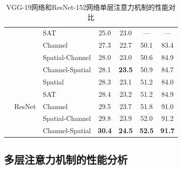 \begin{table}[htbp]
{\begin{tabular}{|l| l |l| c c c c|}
&  & SAT & 25.0 & 23.0 & --- & --- \\
&  & Channel & 27.3 & 22.7 & 50.1 & 83.4 \\
& & Spatial-Channel &28.0 &23.0 & 50.6& 84.9\\
& & Channel-Spatial & 28.1 & \textbf{23.5} & 50.9& 84.7\\
\cline{2-7}
& \multirow{5}{*}{ResNet} & Spatial & 28.3 & 23.1 & 51.2 & 84.0 \\
&  & SAT & 28.4 & 23.2 & 51.2 & 84.9 \\
&  & Channel & 29.5 & 23.7 & 51.8 & 91.0 \\
& & Spatial-Channel &29.8 &23.9 & 52.0& 91.2\\
& & Channel-Spatial & \textbf{30.4} & \textbf{24.5} & \textbf{52.5} & \textbf{91.7}\\
\hline
\end{tabular}}
\caption{VGG-19网络和ResNet-152网络单层注意力机制的性能对比} 
\label{ch5:tab:Q1}
\end{table}


\subsection{多层注意力机制的性能分析}

